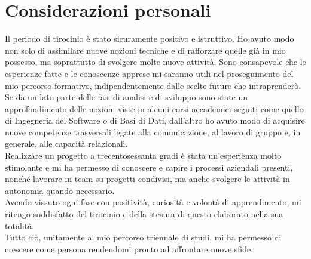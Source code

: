 \section{Considerazioni personali}
\label{sec:personali}
Il periodo di tirocinio è stato sicuramente positivo e istruttivo. Ho avuto modo non solo di assimilare nuove nozioni tecniche e di rafforzare quelle già in mio possesso, ma soprattutto di svolgere molte nuove attività. Sono consapevole che le esperienze fatte e le conoscenze apprese mi saranno utili nel proseguimento del mio percorso formativo, indipendentemente dalle scelte future che intraprenderò.\newline
Se da un lato parte delle fasi di analisi e di sviluppo sono state un approfondimento delle nozioni viste in alcuni corsi accademici seguiti come quello di Ingegneria del Software o di Basi di Dati, dall'altro ho avuto modo di acquisire nuove competenze trasversali legate alla comunicazione, al lavoro di gruppo e, in generale, alle capacità relazionali. \\
\newline
Realizzare un progetto a trecentosessanta gradi è stata un'esperienza molto stimolante e mi ha permesso di conoscere e capire i processi aziendali presenti, nonché lavorare in team su progetti condivisi, ma anche svolgere le attività in autonomia quando necessario.\\
\newline
Avendo vissuto ogni fase con positività, curiosità e volontà di apprendimento, mi ritengo soddisfatto del tirocinio e della stesura di questo elaborato nella sua totalità.\\
Tutto ciò, unitamente al mio percorso triennale di studi, mi ha permesso di crescere come persona rendendomi pronto ad affrontare nuove sfide.

  